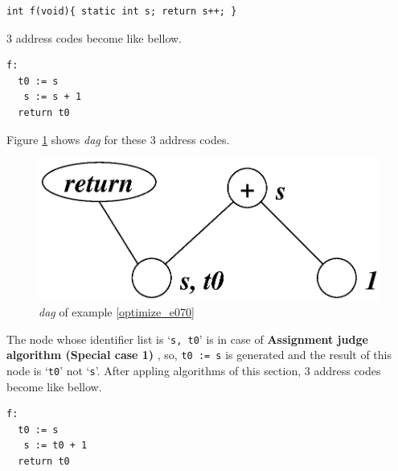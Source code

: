 \begin{Example}
\label{optimize_e070}
\begin{verbatim}
int f(void){ static int s; return s++; }
\end{verbatim}
3 address codes become like bellow.
\begin{verbatim}
f:
  t0 := s
   s := s + 1
  return t0
\end{verbatim}
Figure \ref{optimize_e071} shows {\em dag} for these 3 address codes.
\begin{figure}[htbp]
\begin{center}
\includegraphics[width=0.8\linewidth,height=0.347\linewidth]{opt029.eps}
\caption{{\em dag} of example \ref{optimize_e070}}
\label{optimize_e071}
\end{center}
\end{figure}
The node whose identifier list is `{\tt{s, t0}}'
is in case of {\bf Assignment judge algorithm (Special case 1) },
so, {\tt{t0 := s}} is generated and the result of this node
is `{\tt{t0}}' not `{\tt{s}}'.
After appling algorithms of this section,
3 address codes become like bellow.
\begin{verbatim}
f:
  t0 := s
   s := t0 + 1
  return t0
\end{verbatim}
\end{Example}

